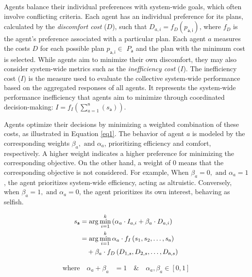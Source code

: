 \documentclass[journal]{IEEEtran}
\newcommand{\NumAgents}{\ensuremath{\mathsf{n}}}
\newcommand{\PossiblePlans}{\ensuremath{P_\mathsf{a}}}
\newcommand{\Plan}{\ensuremath{p_\mathsf{a,i}}}
\newcommand{\SelectedPlan}{\ensuremath{s_\mathsf{a}}}
\newcommand{\DiscomfortCost}{\ensuremath{D}}
\newcommand{\DiscomfortFunction}{\ensuremath{f_D}}
\newcommand{\InefficiencyCost}{\ensuremath{I}}
\newcommand{\InefficiencyFunction}{\ensuremath{f_I}}
\newcommand{\NumPlans}{\ensuremath{k}}
\begin{document}
Agents balance their individual preferences with system-wide goals, which often involve conflicting criteria. Each agent has an individual preference for its plans, calculated by the \textit{discomfort cost} (\DiscomfortCost), such that \DiscomfortCost\(_{a,i} = \DiscomfortFunction(\Plan)\), where \DiscomfortFunction{} is the agent's preference associated with a particular plan. Each agent $a$ measures the costs \DiscomfortCost{} for each possible plan \Plan $\in$ \PossiblePlans{} and the plan with the minimum cost is selected. While agents aim to minimize their own discomfort, they may also consider system-wide metrics such as the \textit{inefficiency cost} (\InefficiencyCost). The inefficiency cost (\InefficiencyCost) is the measure used to evaluate the collective system-wide performance based on the aggregated responses of all agents. It represents the system-wide performance inefficiency that agents aim to minimize through coordinated decision-making: $\InefficiencyCost = \InefficiencyFunction\left(\sum_{a=1}^{\NumAgents}(\SelectedPlan)\right)$. 

Agents optimize their decisions by minimizing a weighted combination of these costs, as illustrated in Equation \ref{eq1}. The behavior of agent $a$ is modeled by the corresponding weights $\beta_a, \text{ and } \alpha_a$, prioritizing efficiency and comfort, respectively. A higher weight indicates a higher preference for minimizing the corresponding objective. On the other hand, a weight of 0 means that the corresponding objective is not considered. For example, When $\beta_a = 0, \text{ and } \alpha_a = 1$, the agent prioritizes system-wide efficiency, acting as altruistic. Conversely, when $\beta_a = 1, \text{ and } \alpha_a = 0$, the agent prioritizes its own interest, behaving as selfish.

\begin{align}
    \SelectedPlan &= \arg\min_{i=1}^{\NumPlans} \left( \alpha_a \cdot \InefficiencyCost_{a,i} + \beta_a \cdot \DiscomfortCost_{a,i} \right) \nonumber \\
     &= \arg\min_{i=1}^{\NumPlans}  \alpha_a \cdot \InefficiencyFunction\left(s_1, s_2, \ldots, s_{\NumAgents}\right) \notag \\
    &\quad + \beta_a \cdot \DiscomfortFunction \left(\DiscomfortCost_{1,s}, \DiscomfortCost_{2,s}, \ldots, \DiscomfortCost_{\NumAgents,s}\right) \label{eq1}
\end{align}
 
\begin{align*}
\text{where} \quad  \alpha_a + \beta_a &= 1 \quad \text{\&} \quad \alpha_a, \beta_a \in [0, 1]
\end{align*}
\end{document}
